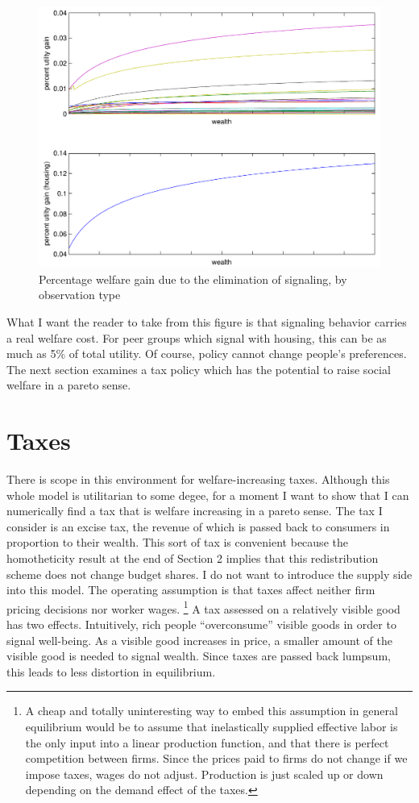 \documentclass[12pt]{article}
\begin{document}
\begin{figure}
    \centering
	\includegraphics[scale=.8]{pics/uchnge_cropped.pdf}
    \caption{Percentage welfare gain due to the elimination of signaling, by observation type}
    \label{fig:uchnge}
\end{figure}
What I want the reader to take from this figure is that signaling behavior carries a real welfare cost.  For peer groups which signal with housing, this can be as much as 5\% of total utility.  Of course, policy cannot change people's preferences.  The next section examines a tax policy which has the potential to raise social welfare in a pareto sense.

\section{Taxes}
There is scope in this environment for welfare-increasing taxes.  
Although this whole model is utilitarian to some degee, for a moment I want to show that I can numerically find a tax that is welfare increasing in a pareto sense.  
The tax I consider is an excise tax, the revenue of which is passed back to consumers in proportion to their wealth.
This sort of tax is convenient because the homotheticity result at the end of Section 2 implies that this redistribution scheme does not change budget shares.
I do not want to introduce the supply side into this model.
The operating assumption is that taxes affect neither firm pricing decisions nor worker wages.
\footnote{
    A cheap and totally uninteresting way to embed this assumption in general equilibrium would be to assume that inelastically supplied effective labor is the only input into a linear production function, and that there is perfect competition between firms.
    Since the prices paid to firms do not change if we impose taxes, wages do not adjust.
    Production is just scaled up or down depending on the demand effect of the taxes.
}
A tax assessed on a relatively visible good has two effects.
Intuitively, rich people ``overconsume'' visible goods in order to signal well-being.
As a visible good increases in price, a smaller amount of the visible good is needed to signal wealth.
Since taxes are passed back lumpsum, this leads to less distortion in equilibrium.
\end{document}
